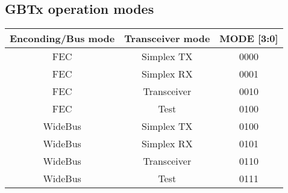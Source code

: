 \subsection{GBTx operation modes} \label{appx:4bit}
\begin{center}
    \begin{tabular}{ccc}
        \toprule
        Enconding/Bus mode & Transceiver mode & MODE [3:0] \\
        \midrule
        FEC & Simplex TX  & 0000 \\
        FEC & Simplex RX  & 0001 \\
        FEC & Transceiver & 0010 \\
        FEC & Test        & 0100 \\
        WideBus & Simplex TX  & 0100 \\
        WideBus & Simplex RX  & 0101 \\
        WideBus & Transceiver & 0110 \\
        WideBus & Test        & 0111 \\
        \bottomrule
    \end{tabular}
    \label{tab:gbtx-modes}
\end{center}

